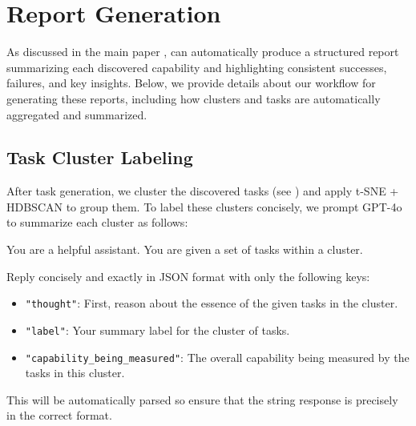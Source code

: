 \section{Report Generation}
\label{appsec:report_generation}

As discussed in the main paper , \ouralgolong can automatically produce a structured report summarizing each discovered capability and highlighting consistent successes, failures, and key insights. Below, we provide details about our workflow for generating these reports, including how clusters and tasks are automatically aggregated and summarized.

\subsection{Task Cluster Labeling}
\label{appsubsec:task_cluster_label}

After task generation, we cluster the discovered tasks (see ) and apply t-SNE + HDBSCAN to group them. To label these clusters concisely, we prompt GPT-4o to summarize each cluster as follows:

\begin{tcolorbox}[breakable,boxrule=0.5pt,sharp corners,fontupper=\small,
colback=orange!5!white, colframe=orange!80!black, title={Task Cluster Labelling System Prompt}]
You are a helpful assistant. You are given a set of tasks within a cluster.

Reply concisely and exactly in JSON format with only the following keys:
\begin{itemize}
    \item \texttt{"thought"}: First, reason about the essence of the given tasks in the cluster.
    \item \texttt{"label"}: Your summary label for the cluster of tasks.
    \item \texttt{"capability\_being\_measured"}: The overall capability being measured by the tasks in this cluster.
\end{itemize}

This will be automatically parsed so ensure that the string response is precisely in the correct format.
\end{tcolorbox}

